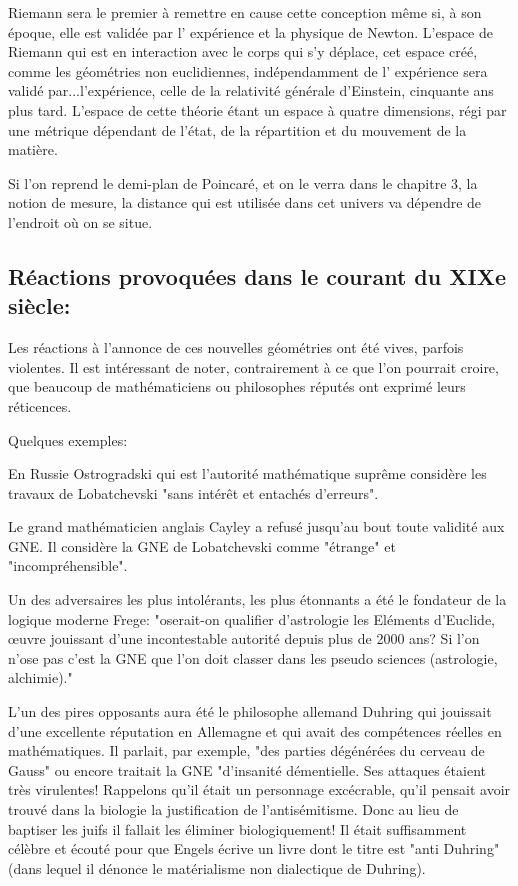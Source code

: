 \documentclass[a4paper, 12pt, twoside]{book}
\begin{document}
  Riemann sera le premier à remettre en cause cette conception même si, à son époque, elle est validée par l’ expérience et la physique de Newton. L’espace de Riemann qui est en interaction avec le corps qui s’y déplace, cet espace créé, comme les géométries non euclidiennes, indépendamment de l’ expérience sera validé par...l’expérience, celle de la relativité générale d’Einstein, cinquante ans plus tard. L’espace de cette théorie étant un espace à quatre dimensions, régi par une métrique dépendant de l’état, de la répartition et du mouvement de la matière.

   Si l'on reprend le demi-plan de Poincaré, et on le verra dans le chapitre 3, la notion de mesure, la distance qui est utilisée dans cet univers va dépendre de l'endroit où on se situe.
     
     \subsection{Réactions provoquées dans le courant du XIXe siècle:}
       Les réactions à l'annonce de ces nouvelles géométries ont été vives, parfois violentes. Il est intéressant de noter, contrairement à ce que l'on pourrait croire, que beaucoup de mathématiciens ou philosophes réputés ont exprimé leurs réticences.\medskip 
       

  Quelques exemples:\medskip 
  

  En Russie Ostrogradski qui est l'autorité mathématique suprême considère les travaux de Lobatchevski "sans intérêt et entachés d'erreurs".\medskip 
  

  Le grand mathématicien anglais Cayley a refusé jusqu'au bout toute validité aux GNE.  Il considère la GNE de Lobatchevski comme "étrange" et "incompréhensible".
\medskip 

  Un des adversaires les plus intolérants, les plus étonnants a été le fondateur de la logique moderne Frege: "oserait-on qualifier d'astrologie les Eléments d'Euclide, œuvre jouissant d'une incontestable autorité depuis plus de 2000 ans? Si l'on n'ose pas c'est la GNE que l'on doit classer dans les pseudo sciences (astrologie, alchimie)."\medskip 
  

   L'un des pires opposants aura été le philosophe allemand Duhring qui jouissait d'une excellente réputation en Allemagne et qui avait des compétences réelles en mathématiques. Il parlait, par exemple, "des parties dégénérées du cerveau de Gauss" ou encore traitait la GNE "d'insanité démentielle. Ses attaques étaient très virulentes! Rappelons qu'il était un personnage excécrable, qu'il pensait avoir trouvé dans la biologie la justification de l'antisémitisme. Donc au lieu de baptiser les juifs il fallait les éliminer biologiquement! Il était suffisamment célèbre et écouté pour que Engels écrive un livre dont le titre est "anti Duhring" (dans lequel il dénonce le matérialisme non dialectique de Duhring).\medskip 
   
\end{document}
